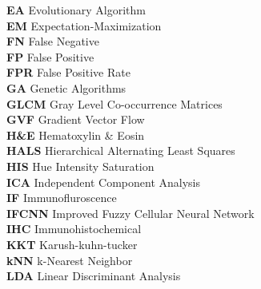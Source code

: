 \begin{nomenclature}
\begin{tabbing}
 \textbf{EA} \> \quad \quad\quad Evolutionary Algorithm \\

 \textbf{EM} \> \quad \quad\quad Expectation-Maximization\\

 \textbf{FN} \> \quad \quad\quad False Negative\\

 \textbf{FP}  \> \quad \quad\quad False Positive\\

  \textbf{FPR} \> \quad \quad\quad False Positive Rate\\

 \textbf{GA}  \> \quad \quad\quad Genetic Algorithms \\

 \textbf{GLCM}  \> \quad \quad\quad Gray Level Co-occurrence Matrices  \\

 \textbf{GVF}  \> \quad \quad\quad Gradient Vector Flow \\

  \textbf{H\&E} \> \quad \quad\quad Hematoxylin \& Eosin\\

   \textbf{HALS} \> \quad \quad\quad Hierarchical Alternating Least Squares \\

   \textbf{HIS} \> \quad \quad\quad Hue Intensity Saturation\\



   \textbf{ICA} \> \quad \quad\quad Independent Component Analysis\\

  \textbf{IF} \> \quad \quad\quad Immunofluroscence\\

  \textbf{IFCNN} \> \quad \quad\quad Improved Fuzzy Cellular Neural Network \\

  \textbf{IHC} \> \quad \quad\quad Immunohistochemical\\


 \textbf{KKT} \> \quad \quad\quad Karush-kuhn-tucker\\

  \textbf{kNN} \> \quad \quad\quad k-Nearest Neighbor\\

  \textbf{LDA} \> \quad \quad\quad Linear Discriminant Analysis\\


\end{tabbing}
\end{nomenclature}
